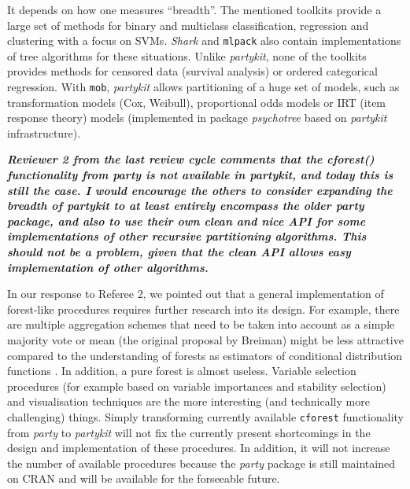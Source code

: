 \documentclass{article}
\begin{document}
\smallskip

It depends on how one measures ``breadth''. The mentioned toolkits provide a
large set of methods for binary and multiclass classification, regression
and clustering with a focus on SVMs.  \emph{Shark} and \texttt{mlpack} also
contain implementations of tree algorithms for these situations.  Unlike
\emph{partykit}, none of the toolkits provides methods for censored data (survival
analysis) or ordered categorical regression.  With \texttt{mob},
\emph{partykit} allows partitioning of a huge set of models, such as transformation models (Cox,
Weibull), proportional odds models or IRT (item response theory) models
(implemented in package \emph{psychotree} based on \emph{partykit} infrastructure).  

\smallskip

\textbf{\textit{%
Reviewer 2 from the last review cycle comments that the cforest()
functionality from party is not available in partykit, and today this is
still the case.  I would encourage the others to consider expanding the
breadth of partykit to at least entirely encompass the older party package,
and also to use their own clean and nice API for some implementations of
other recursive partitioning algorithms.  This should not be a problem,
given that the clean API allows easy implementation of other algorithms.}}

\smallskip

In our response to Referee 2, we pointed out that a general implementation
of forest-like procedures requires further research into its design. For
example, there are multiple aggregation schemes that need to be taken into
account as a simple majority vote or mean (the original proposal by Breiman)
might be less attractive compared to the understanding of forests as
estimators of conditional distribution functions \citep{Meinshausen_2006}. In
addition, a pure forest is almost useless. Variable selection procedures
(for example based on variable importances and stability selection) and visualisation techniques are
the more interesting (and technically more challenging) things. Simply
transforming currently available \texttt{cforest} functionality from \emph{party} to
\emph{partykit}
will not fix the currently present shortcomings in the design and
implementation of these procedures. In addition, it will not increase the
number of available procedures because the \emph{party} package is still maintained
on CRAN and will be available for the forseeable future.

\smallskip
\end{document}
